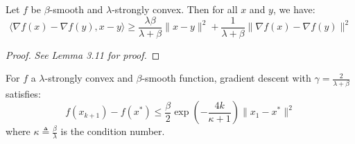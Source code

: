 \documentclass{article}
\begin{document}
\begin{lemma} Let $f$ be $\beta$-smooth and $\lambda$-strongly convex. Then for all $x$ and $y$, we have:
$$ \langle \nabla f(x) - \nabla f(y), x-y \rangle \geq \frac{\lambda\beta}{\lambda + \beta} \| x-y\|^2 + \frac{1}{\lambda + \beta} \| \nabla f(x) - \nabla f(y) \|^2 $$

\end{lemma}

\begin{proof}
\textit{See \cite{bubeck2015convex} Lemma 3.11 for proof.}
\end{proof}
\begin{thm}\label{thm:str-cvx-smth}
For $f$ a $\lambda$-strongly convex and $\beta$-smooth function, gradient descent with $\gamma = \frac{2}{\lambda + \beta}$ satisfies:
\[
	f(x_{k+1}) - f(x^{*}) \leq \frac{\beta}{2} \exp \left( -\frac{4k}{\kappa + 1} \right) \| x_1 - x^{*} \|^2
\]
where $\kappa \triangleq \frac{\beta}{\lambda}$ is the condition number.
\end{thm}
\end{document}
